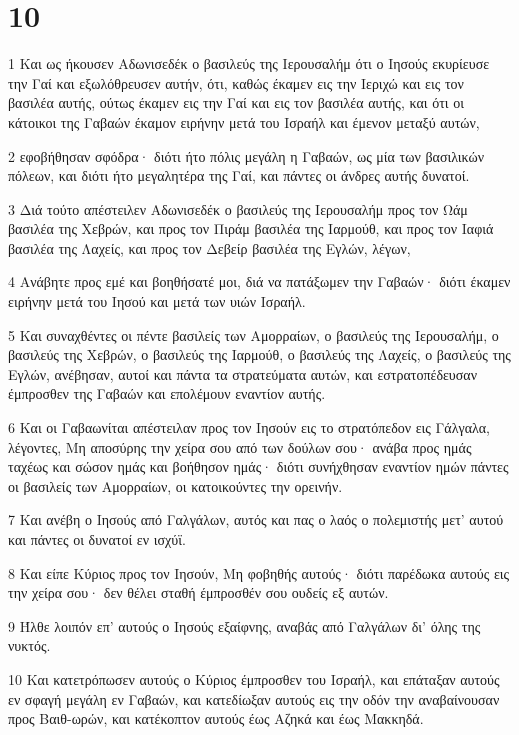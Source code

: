 \chapter{10}

\par 1 Και ως ήκουσεν Αδωνισεδέκ ο βασιλεύς της Ιερουσαλήμ ότι ο Ιησούς εκυρίευσε την Γαί και εξωλόθρευσεν αυτήν, ότι, καθώς έκαμεν εις την Ιεριχώ και εις τον βασιλέα αυτής, ούτως έκαμεν εις την Γαί και εις τον βασιλέα αυτής, και ότι οι κάτοικοι της Γαβαών έκαμον ειρήνην μετά του Ισραήλ και έμενον μεταξύ αυτών,
\par 2 εφοβήθησαν σφόδρα· διότι ήτο πόλις μεγάλη η Γαβαών, ως μία των βασιλικών πόλεων, και διότι ήτο μεγαλητέρα της Γαί, και πάντες οι άνδρες αυτής δυνατοί.
\par 3 Διά τούτο απέστειλεν Αδωνισεδέκ ο βασιλεύς της Ιερουσαλήμ προς τον Ωάμ βασιλέα της Χεβρών, και προς τον Πιράμ βασιλέα της Ιαρμούθ, και προς τον Ιαφιά βασιλέα της Λαχείς, και προς τον Δεβείρ βασιλέα της Εγλών, λέγων,
\par 4 Ανάβητε προς εμέ και βοηθήσατέ μοι, διά να πατάξωμεν την Γαβαών· διότι έκαμεν ειρήνην μετά του Ιησού και μετά των υιών Ισραήλ.
\par 5 Και συναχθέντες οι πέντε βασιλείς των Αμορραίων, ο βασιλεύς της Ιερουσαλήμ, ο βασιλεύς της Χεβρών, ο βασιλεύς της Ιαρμούθ, ο βασιλεύς της Λαχείς, ο βασιλεύς της Εγλών, ανέβησαν, αυτοί και πάντα τα στρατεύματα αυτών, και εστρατοπέδευσαν έμπροσθεν της Γαβαών και επολέμουν εναντίον αυτής.
\par 6 Και οι Γαβαωνίται απέστειλαν προς τον Ιησούν εις το στρατόπεδον εις Γάλγαλα, λέγοντες, Μη αποσύρης την χείρα σου από των δούλων σου· ανάβα προς ημάς ταχέως και σώσον ημάς και βοήθησον ημάς· διότι συνήχθησαν εναντίον ημών πάντες οι βασιλείς των Αμορραίων, οι κατοικούντες την ορεινήν.
\par 7 Και ανέβη ο Ιησούς από Γαλγάλων, αυτός και πας ο λαός ο πολεμιστής μετ' αυτού και πάντες οι δυνατοί εν ισχύϊ.
\par 8 Και είπε Κύριος προς τον Ιησούν, Μη φοβηθής αυτούς· διότι παρέδωκα αυτούς εις την χείρα σου· δεν θέλει σταθή έμπροσθέν σου ουδείς εξ αυτών.
\par 9 Ήλθε λοιπόν επ' αυτούς ο Ιησούς εξαίφνης, αναβάς από Γαλγάλων δι' όλης της νυκτός.
\par 10 Και κατετρόπωσεν αυτούς ο Κύριος έμπροσθεν του Ισραήλ, και επάταξαν αυτούς εν σφαγή μεγάλη εν Γαβαών, και κατεδίωξαν αυτούς εις την οδόν την αναβαίνουσαν προς Βαιθ-ωρών, και κατέκοπτον αυτούς έως Αζηκά και έως Μακκηδά.
